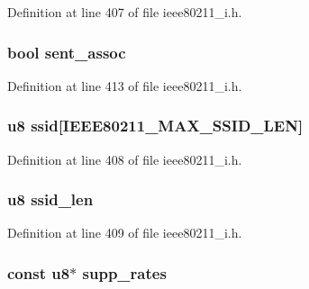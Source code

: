 Definition at line 407 of file ieee80211\-\_\-i.\-h.

\hypertarget{structieee80211__mgd__assoc__data_a03c1b4aa3a5243fe109572ed4383d718}{
\subsubsection[{sent\-\_\-assoc}]{\setlength{\rightskip}{0pt plus 5cm}bool sent\-\_\-assoc}}\label{structieee80211__mgd__assoc__data_a03c1b4aa3a5243fe109572ed4383d718}


Definition at line 413 of file ieee80211\-\_\-i.\-h.

\hypertarget{structieee80211__mgd__assoc__data_ae8d768cff77168f424870b6745c90714}{
\subsubsection[{ssid}]{\setlength{\rightskip}{0pt plus 5cm}u8 ssid\mbox{[}I\-E\-E\-E80211\-\_\-\-M\-A\-X\-\_\-\-S\-S\-I\-D\-\_\-\-L\-E\-N\mbox{]}}}\label{structieee80211__mgd__assoc__data_ae8d768cff77168f424870b6745c90714}


Definition at line 408 of file ieee80211\-\_\-i.\-h.

\hypertarget{structieee80211__mgd__assoc__data_a440f44724caffefa0f9c838518a3c790}{
\subsubsection[{ssid\-\_\-len}]{\setlength{\rightskip}{0pt plus 5cm}u8 ssid\-\_\-len}}\label{structieee80211__mgd__assoc__data_a440f44724caffefa0f9c838518a3c790}


Definition at line 409 of file ieee80211\-\_\-i.\-h.

\hypertarget{structieee80211__mgd__assoc__data_a81733160347428a461c99d85fd919ca3}{
\subsubsection[{supp\-\_\-rates}]{\setlength{\rightskip}{0pt plus 5cm}const u8$\ast$ supp\-\_\-rates}}\label{structieee80211__mgd__assoc__data_a81733160347428a461c99d85fd919ca3}


